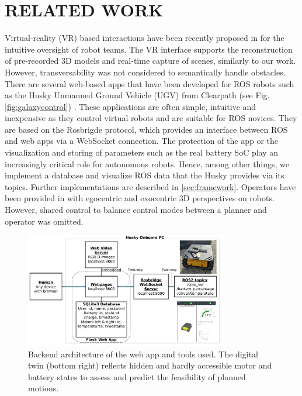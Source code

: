\documentclass[letterpaper, 10 pt, conference]{ieeeconf}  %
\begin{document}
\section{RELATED WORK}

Virtual-reality (VR) based interactions have been recently proposed in \cite{huang2024evaluation} for the intuitive oversight of robot teams. The VR interface supports the reconstruction of pre-recorded 3D models and real-time capture of scenes, similarly to our work. However,  transversability was not considered to semantically handle obstacles. There are several web-based apps that have been developed for ROS robots such as the Husky Unmanned Ground Vehicle (UGV) from Clearpath (see Fig.\ref{fig:galaxycontrol}) \cite{husky}. These applications are often simple, intuitive and inexpensive as they control virtual robots and are suitable for ROS novices.
They are based on the Rosbrigde protocol, which provides an interface between ROS and web apps via a WebSocket connection\cite{kapic,dinodi,rosbridgeOkState,rosbridgeSuite}.
The protection of the app or the visualization and storing of parameters such as the real battery SoC play an increasingly critical role for autonomous robots.
Hence, among other things, we implement a database and visualize ROS data that the Husky provides via its topics.  Further implementations are described in \ref{sec:framework}.
Operators have been provided in \cite{walker2024cyber} with egocentric and exocentric 3D perspectives on robots. However, shared control to balance control modes between a planner and operator was omitted. 

\begin{figure}[b]
	\centerline{\includegraphics[width=8.9cm]{images/ROS_Web_App_Architecture.pdf}}
	\caption{Backend architecture of the web app and tools used. The digital twin (bottom right) reflects hidden and hardly accessible motor and battery states to assess and predict the feasibility of planned motions.}
	\label{fig:userapp}
\end{figure}
\end{document}
